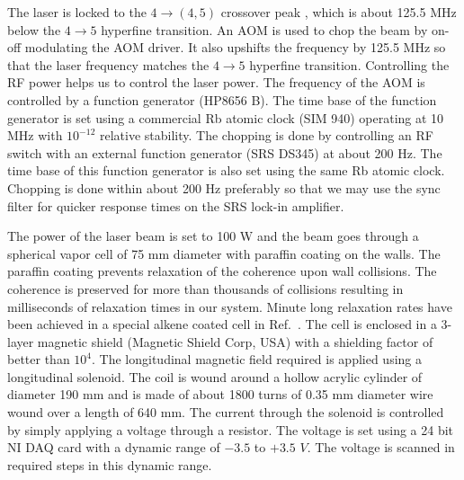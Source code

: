 \begin{enumerate}
The laser is locked to the  $ 4 \rightarrow (4,5) $ crossover peak , which is about 125.5 MHz below the $ 4 \rightarrow 5 $ hyperfine transition. An AOM is used to chop the beam by on-off modulating the AOM driver. It also upshifts the frequency by 125.5 MHz so that the laser frequency matches the $4\rightarrow 5 $ hyperfine transition. Controlling the RF power helps us to control the laser power. The frequency of the AOM is controlled by a function generator (HP8656 B). The time base of the function generator is set using a commercial Rb atomic clock (SIM 940) operating at 10 MHz with $10^{-12}$ relative stability. The chopping is done by controlling an RF switch with an external function generator (SRS DS345) at about 200 Hz. The time base of this function generator is also set using the same Rb atomic clock. Chopping is done within about 200 Hz preferably so that we may use the sync filter for quicker response times on the SRS lock-in amplifier.

The power of the laser beam is set to 100 \textmu W and the beam goes through a spherical vapor cell of 75 mm diameter with paraffin coating on the walls. The paraffin coating prevents relaxation of the coherence upon wall collisions. The coherence is preserved for more than thousands of collisions resulting in milliseconds of relaxation times in our system. Minute long relaxation rates have been achieved in a special alkene coated cell in Ref.\ \cite{BKL10}. The cell is enclosed in a 3-layer magnetic shield (Magnetic Shield Corp, USA) with a shielding factor of better than $10^4$. The longitudinal magnetic field required is applied using a longitudinal solenoid. The coil is wound around a hollow acrylic cylinder of diameter 190 mm and is made of about 1800 turns of 0.35 mm diameter wire wound over a length of 640 mm. The current through the solenoid is controlled by simply applying a voltage through a resistor. The voltage is set using a 24 bit NI DAQ card with a dynamic range of $-3.5$ to $+3.5$ $V$. The voltage is scanned in required steps in this dynamic range. 


\end{enumerate}
